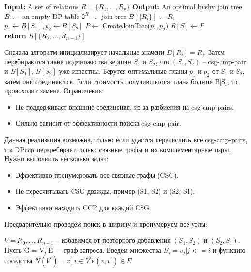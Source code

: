 \documentclass[12pt]{article}
\begin{document}
\begin{flushleft}
\begin{algorithm}
    \begin{algorithmic}[1]
        \State \textbf{Input:} A set of relations $R = \{R_1, \dots, R_n\}$
        \State \textbf{Output:} An optimal bushy join tree
        \State $B \gets$ an empty DP table $2^R \to$ join tree
            \State $B[\{R_i\}] \gets R_i$
        \EndFor
            \State $p_1 \gets B[S_1], p_2 \gets B[S_2]$
            \State $P \gets$ CreateJoinTree($p_1, p_2$)
                \State $B[S] \gets P$
            \EndIf
        \EndFor \\
        \textbf{return} $B[\{R_0, \dots, R_{n-1}\}]$
    \end{algorithmic}
\end{algorithm}

Сначала алгоритм инициализирует начальные значени $B[{R_i}] = R_i$.
Затем перебираются такие подмножества вершин $S_1$ и $S_2$, 
что $(S_1, S_2)$ -- csg-cmp-pair и $B[S_1]$, $B[S_2]$ уже известны. 
Берутся оптимальные планы $p_1$ и $p_2$ от $S_1$ и $S_2$, затем они 
соединяются. Если стоимость получившегося плана больше B[S], то 
происходит замена. Ограничения:
\begin{itemize}
    \item Не поддерживает внешние соединения, из-за разбиения на csg-cmp-pairs.
    \item Сильно зависит от эффективности поиска csg-cmp-pair.
\end{itemize}

Данная реализация возможна, только если удастся перечислить все 
csg-cmp-pairs, т.к DPccp переребирает только связные графы и их комплементарные пары.
Нужно выполнить несколько задач: 
\begin{itemize}
    \item Эффективно пронумеровать все связные графы (CSG).
    \item Не пересчитывать CSG дважды, пример (S1, S2) и (S2, S1).
    \item Эффективно находить CCP для каждой CSG.
\end{itemize}

Предварительно проведём поиск в ширину и пронумеруем все узлы:

$V = {R_0, \dots,R_{n-1}}$ -- избавимся от повторного добавления $(S_1, S_2)$ и $(S_2, S_1)$.
Пусть G = {V, E} — граф запроса.
Введём множества $B_i = {v_j | j <= i}$ и функцию соседства 
$N(V^{'}) = {v^{'} | v \in V^{'} и (v,v^{'}) \in E}$
\newline


\end{flushleft}
\end{document}
